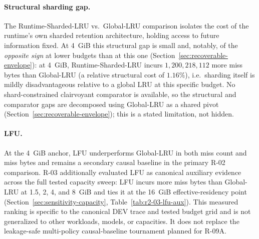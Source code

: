 \paragraph{Structural sharding gap.} The Runtime-Sharded-LRU vs.\
Global-LRU comparison isolates the cost of the runtime's own sharded
retention architecture, holding access to future information fixed.
At 4~GiB this structural gap is small and, notably, of the \emph{opposite
sign} at lower budgets than at this one (Section~\ref{sec:recoverable-envelope}):
at 4~GiB, Runtime-Sharded-LRU incurs $1{,}200{,}218{,}112$ more miss bytes
than Global-LRU (a relative structural cost of $1.16\%$), i.e.\ sharding
itself is mildly disadvantageous relative to a global LRU at this
specific budget. No shard-constrained clairvoyant comparator is available,
so the structural and comparator gaps are decomposed
using Global-LRU as a shared pivot (Section~\ref{sec:recoverable-envelope});
this is a stated limitation, not hidden.

\paragraph{LFU.} At the 4~GiB anchor, LFU underperforms Global-LRU in
both miss count and miss bytes and remains a secondary causal baseline in
the primary R-02 comparison. R-03 additionally evaluated LFU as canonical
auxiliary evidence across the full tested capacity sweep: LFU incurs more
miss bytes than Global-LRU at 1.5, 2, 4, and 8~GiB and ties it at the
16~GiB effective-residency point (Section~\ref{sec:sensitivity-capacity},
Table~\ref{tab:r2-03-lfu-aux}). This measured ranking is specific to the
canonical DEV trace and tested budget grid and is not generalized to other
workloads, models, or capacities. It does not replace the leakage-safe
multi-policy causal-baseline tournament planned for R-09A.
